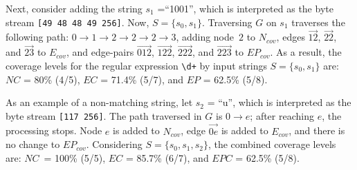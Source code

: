 
Next, consider adding the string $s_1$ =``1001'', which is interpreted as the byte stream {\tt [49 48 48 49 256]}. Now, $S = \{s_0, s_1\}$.
Traversing $G$ on $s_1$ traverses the following path: $0 \rightarrow 1 \rightarrow 2 \rightarrow 2 \rightarrow 2 \rightarrow 3$, adding node~$2$ to $N_{cov}$, edges  $\overrightarrow{12}$, $\overrightarrow{22}$, and $\overrightarrow{23}$ to $E_{cov}$, and edge-pairs $\overrightarrow{012}$, $\overrightarrow{122}$, $\overrightarrow{222}$, and $\overrightarrow{223}$ to $EP_{cov}$. 
As a result, the coverage levels for the regular expression \verb!\d+! by input strings $S = \{s_0, s_1\}$ are: 
$NC$ = 80\% (4/5), $EC$ = 71.4\% (5/7), and $EP$ = 62.5\% (5/8).

As an example of a non-matching string, let $s_2$ = ``u'', which is interpreted as the byte stream {\tt [117 256]}. 
The path traversed in $G$ is $0 \rightarrow e$; after reaching $e$, the processing stops. 
Node $e$ is added to $N_{cov}$, edge $\overrightarrow{0e}$ is added to $E_{cov}$, and there is no change to $EP_{cov}$. 
Considering $S = \{s_0, s_1, s_2\}$, the combined coverage levels are: $NC$~= 100\% (5/5), $EC$ = 85.7\% (6/7), and $EPC$ =  62.5\% (5/8). %

